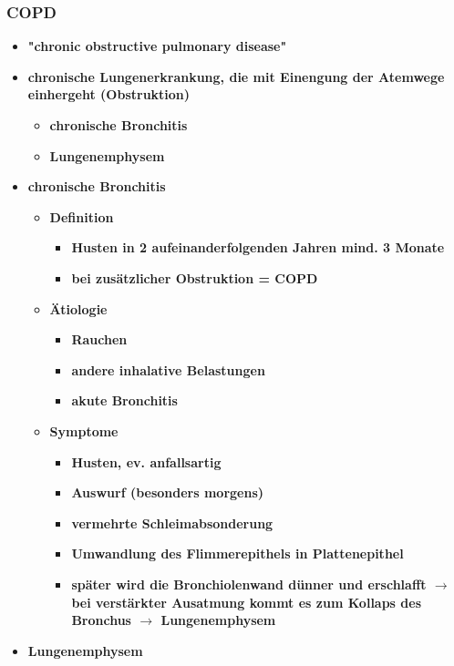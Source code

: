 \begin{itemize}
	\subsubsection{COPD}
		\begin{itemize}
			\item \textbf{"chronic obstructive pulmonary disease"}
			\item \textbf{chronische Lungenerkrankung, die mit Einengung der Atemwege einhergeht (Obstruktion)}
				\begin{itemize}
					\item \textbf{chronische Bronchitis}
					\item \textbf{Lungenemphysem}
				\end{itemize}
			\item \textbf{chronische Bronchitis}
				\begin{itemize}
					\item \textbf{Definition}
						\begin{itemize}
							\item \textbf{Husten in 2 aufeinanderfolgenden Jahren mind. 3 Monate}
							\item \textbf{bei zusätzlicher Obstruktion = COPD}
						\end{itemize}
					\item \textbf{Ätiologie}
						\begin{itemize}
							\item \textbf{Rauchen}
							\item \textbf{andere inhalative Belastungen}
							\item \textbf{akute Bronchitis}
						\end{itemize}
		\pagebreak
					\item \textbf{Symptome}
						\begin{itemize}
							\item \textbf{Husten, ev. anfallsartig}
							\item \textbf{Auswurf (besonders morgens)}
							\item \textbf{vermehrte Schleimabsonderung}
							\item \textbf{Umwandlung des Flimmerepithels in Plattenepithel}
							\item \textbf{später wird die Bronchiolenwand dünner und erschlafft $\rightarrow$ bei verstärkter Ausatmung kommt es zum Kollaps des Bronchus $\rightarrow$ Lungenemphysem}
						\end{itemize}
				\end{itemize}
			\item \textbf{Lungenemphysem}

\end{itemize}
\end{itemize}
